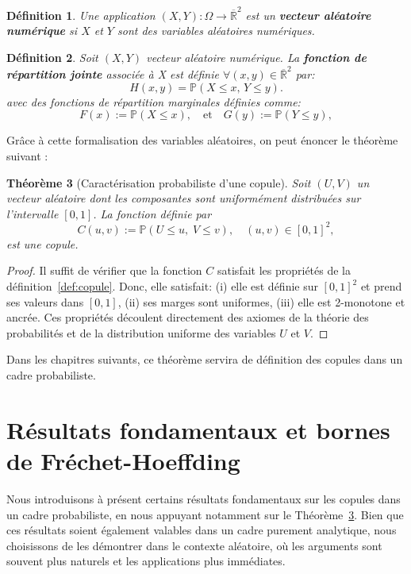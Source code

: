 \documentclass[a4paper,11pt]{amsbook}
\numberwithin{equation}{chapter}
\newtheorem{theoreme}			     {Théorème}	[chapter]
\newtheorem{definition}	[theoreme]   {Définition}
\theoremstyle{definition}
\begin{document}
\begin{definition}
Une application \( (X, Y) : \Omega \to \overline{\mathbb{R}}^2 \) est un \textbf{vecteur aléatoire numérique} si \(X\) et \(Y\) sont des variables aléatoires numériques.
\end{definition}

\begin{definition}\label{def:fonct_va_jointe}
Soit \((X, Y)\) vecteur aléatoire numérique. La \textbf{fonction de répartition jointe} associée à X est définie \(\forall(x,y) \in \overline{\mathbb{R}}^2\) par:
\[
H(x, y) = \mathbb{P}(X \leq x,\, Y \leq y).
\]
avec des fonctions de répartition marginales définies comme:
\[
F(x) := \mathbb{P}(X \leq x), \quad \text{et} \quad
G(y) := \mathbb{P}(Y \leq y), 
\]
\end{definition}




Grâce à cette formalisation des variables aléatoires, on peut énoncer le théorème suivant :
\begin{theoreme}[Caractérisation probabiliste d'une copule]\label{def:cop_va}
Soit \( (U, V) \) un vecteur aléatoire dont les composantes sont uniformément distribuées sur l’intervalle \([0,1]\). La fonction définie par
\[
C(u,v) := \mathbb{P}(U \leq u,\; V \leq v), \quad (u,v) \in [0,1]^2,
\]
est une \emph{copule}.
\end{theoreme}

\begin{proof}
Il suffit de vérifier que la fonction \(C\) satisfait les propriétés de la définition~\ref{def:copule}. Donc, elle satisfait:  
(i) elle est définie sur \([0,1]^2\) et prend ses valeurs dans \([0,1]\),  
(ii) ses marges sont uniformes,  
(iii) elle est 2-monotone et ancrée. 
Ces propriétés découlent directement des axiomes de la théorie des probabilités et de la distribution uniforme des variables \(U\) et \(V\).
\end{proof}

Dans les chapitres suivants, ce théorème servira de définition des copules dans un cadre probabiliste.

\chapter{Résultats fondamentaux et bornes de Fréchet-Hoeffding}

Nous introduisons à présent certains résultats fondamentaux sur les copules dans un cadre probabiliste, en nous appuyant notamment sur le Théorème~\ref{def:cop_va}. Bien que ces résultats soient également valables dans un cadre purement analytique, nous choisissons de les démontrer dans le contexte aléatoire, où les arguments sont souvent plus naturels et les applications plus immédiates.
\end{document}
